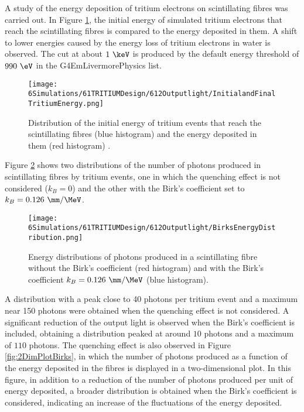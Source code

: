 A study of the energy deposition of tritium electrons on scintillating fibres was carried out. In Figure \ref{fig:InitialFinalTritiumEnergy}, the initial energy of simulated tritium electrons that reach the scintillating fibres is compared to the energy deposited in them. A shift to lower energies caused by the energy loss of tritium electrons in water is observed. The cut at about $1~\keV$ is produced by the default energy threshold of $990~\eV$ in the G4EmLivermorePhysics list.
\begin{figure}[h]
\centering
\texttt{[image: 6Simulations/61TRITIUMDesign/612Outputlight/InitialandFinalTritiumEnergy.png]}
\caption{Distribution of the initial energy of tritium events that reach the scintillating fibres (blue histogram) and the energy deposited in them (red histogram) \cite{SimulationPaperCarlos}.\label{fig:InitialFinalTritiumEnergy}}
\end{figure}
Figure \ref{fig:BirksEffectinEnergyDistribution} shows two distributions of the number of photons produced in scintillating fibres by tritium events, one in which the quenching effect is not considered ($k_B=0$) and the other with the Birk's coefficient set to $k_B=0.126~\mm/\MeV$.
\begin{figure}[h]
\centering
\texttt{[image: 6Simulations/61TRITIUMDesign/612Outputlight/BirksEnergyDistribution.png]}
\caption{Energy distributions of photons produced in a scintillating fibre without the Birk's coefficient (red histogram) and with the Birk's coefficient $k_B=0.126~\mm/\MeV$ \newline (blue histogram)\cite{SimulationPaperCarlos}.\label{fig:BirksEffectinEnergyDistribution}}
\end{figure}  
A distribution with a peak close to 40 photons per tritium event and a maximum near 150 photons were obtained when the quenching effect is not considered. A significant reduction of the output light is observed when the Birk's coefficient is included, obtaining a distribution peaked at around $10$ photons and a maximum of $110$ photons. The quenching effect is also observed in Figure \ref{fig:2DimPlotBirks}, in which the number of photons produced  as a function of the energy deposited in the fibres is displayed in a two-dimensional plot. In this figure, in addition to a reduction of the number of photons produced per unit of energy deposited, a broader distribution is obtained when the Birk's coefficient is considered, indicating an increase of the fluctuations of the energy deposited.

